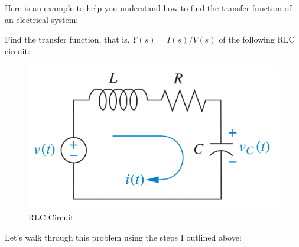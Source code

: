 \documentclass{article}
\theoremstyle{mytheoremstyle}
\theoremstyle{mytheoremstyle}
\theoremstyle{myproblemstyle}
\theoremstyle{break}
\begin{document}
Here is an example to help you understand how to find the transfer function of an electrical system:

\begin{problem}
Find the transfer function, that is, $Y(s) = I(s)/V(s)$ of the following RLC circuit:
\begin{figure}[H]
	\includegraphics[scale=0.1]{Simple RLC Circuit}
	\centering
	\caption{RLC Circuit}
\end{figure}
\end{problem}



Let's walk through this problem using the steps I outlined above:
\end{document}
